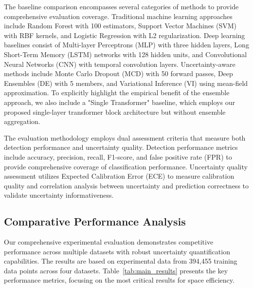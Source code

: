 \documentclass[journal]{IEEEtran}
\begin{document}
The baseline comparison encompasses several categories of methods to provide comprehensive evaluation coverage. Traditional machine learning approaches include Random Forest with 100 estimators, Support Vector Machines (SVM) with RBF kernels, and Logistic Regression with L2 regularization. Deep learning baselines consist of Multi-layer Perceptrons (MLP) with three hidden layers, Long Short-Term Memory (LSTM) networks with 128 hidden units, and Convolutional Neural Networks (CNN) with temporal convolution layers. Uncertainty-aware methods include Monte Carlo Dropout (MCD) with 50 forward passes, Deep Ensembles (DE) with 5 members, and Variational Inference (VI) using mean-field approximation. To explicitly highlight the empirical benefit of the ensemble approach, we also include a "Single Transformer" baseline, which employs our proposed single-layer transformer block architecture but without ensemble aggregation.

The evaluation methodology employs dual assessment criteria that measure both detection performance and uncertainty quality. Detection performance metrics include accuracy, precision, recall, F1-score, and false positive rate (FPR) to provide comprehensive coverage of classification performance. Uncertainty quality assessment utilizes Expected Calibration Error (ECE) to measure calibration quality and correlation analysis between uncertainty and prediction correctness to validate uncertainty informativeness.

\subsection{Comparative Performance Analysis}

Our comprehensive experimental evaluation demonstrates competitive performance across multiple datasets with robust uncertainty quantification capabilities. The results are based on experimental data from 394,455 training data points across four datasets. Table~\ref{tab:main_results} presents the key performance metrics, focusing on the most critical results for space efficiency.
\end{document}
